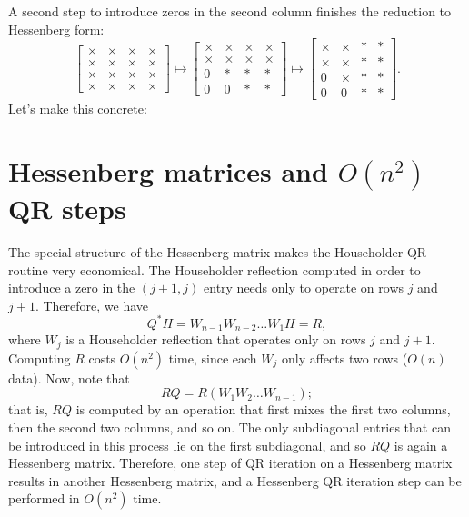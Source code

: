 \documentclass[12pt, leqno]{article}
\begin{document}
A second step to introduce zeros in the second column finishes the
reduction to Hessenberg form:
\[
\begin{bmatrix}
  \times & \times & \times & \times \\
  \times & \times & \times & \times \\
  \times & \times & \times & \times \\
  \times & \times & \times & \times
\end{bmatrix} \mapsto
\begin{bmatrix}
  \times & \times & \times & \times \\
  \times & \times & \times & \times \\
  0 & * & * & * \\
  0 & 0 & * & *
\end{bmatrix} \mapsto
\begin{bmatrix}
  \times & \times & * & * \\
  \times & \times & * & * \\
  0 & \times & * & * \\
  0 & 0 & * & *
\end{bmatrix}.
\]
Let's make this concrete:


\section{Hessenberg matrices and $O(n^2)$ QR steps}

The special structure of the Hessenberg matrix makes the Householder
QR routine very economical.  The Householder reflection computed in
order to introduce a zero in the $(j+1,j)$ entry needs only to operate
on rows $j$ and $j+1$.  Therefore, we have
\[
  Q^* H = W_{n-1} W_{n-2} \ldots W_1 H = R,
\]
where $W_{j}$ is a Householder reflection that operates only on rows
$j$ and $j+1$.  Computing $R$ costs $O(n^2)$ time, since each $W_j$
only affects two rows ($O(n)$ data).  Now, note that
\[
  R Q = R (W_1 W_2 \ldots W_{n-1});
\]
that is, $RQ$ is computed by an operation that first mixes the first
two columns, then the second two columns, and so on.  The only subdiagonal
entries that can be introduced in this process lie on the first subdiagonal,
and so $RQ$ is again a Hessenberg matrix.  Therefore, one step of QR iteration
on a Hessenberg matrix results in another Hessenberg matrix, and a Hessenberg
QR iteration step can be performed in $O(n^2)$ time.
\end{document}
